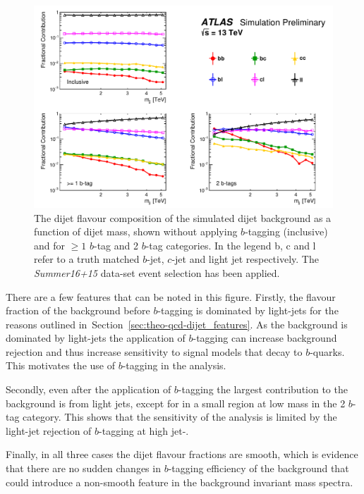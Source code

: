 \begin{figure}[!ht]
  \begin{center}
    \includegraphics[width=0.99\linewidth, angle=0]{figs/Dibjet/ICHEP/evt-summer_flavcomp.pdf}
  \end{center}
  \caption{The dijet flavour composition of the simulated dijet background as a function of dijet mass,
    shown without applying $b$-tagging (inclusive) and for $\geq1$ $b$-tag and 2 $b$-tag categories.
    In the legend b, c and l refer to a truth matched $b$-jet, $c$-jet and light jet respectively.
    The \textit{Summer16+15} data-set event selection has been applied.}
  \label{fig:evt-summer_flavcomp}
\end{figure}

There are a few features that can be noted in this figure.
Firstly, the flavour fraction of the background before $b$-tagging is dominated by light-jets
for the reasons outlined in~Section~\ref{sec:theo-qcd-dijet_features}.
As the background is dominated by light-jets the application
of $b$-tagging can increase background rejection
and thus increase sensitivity to signal models that decay to $b$-quarks.
This motivates the use of $b$-tagging in the analysis.

Secondly, even after the application of $b$-tagging the largest contribution to the background is from light jets,
except for in a small region at low mass in the 2 $b$-tag category.
This shows that the sensitivity of the analysis is limited by the
light-jet rejection of $b$-tagging at high jet-\pT.

Finally, in all three cases the dijet flavour fractions are smooth, which is evidence that
there are no sudden changes in $b$-tagging efficiency of the background that could introduce
a non-smooth feature in the background invariant mass spectra.

